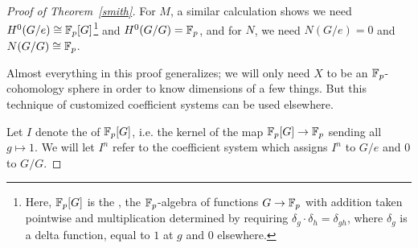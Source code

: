 \begin{proof}[Proof of Theorem~\ref{smith}]
For $M$, a similar calculation shows we need $H^0(G/e)\cong\mathbb F_p[G]$\footnote{Here, $\mathbb F_p[G]$ is the , the $\mathbb F_p$-algebra of functions $G\to\mathbb F_p$ with addition taken pointwise and multiplication determined by
requiring $\delta_g\cdot\delta_h = \delta_{gh}$, where $\delta_g$ is a delta function, equal to $1$ at $g$ and $0$
elsewhere.} and $H^0(G/G) = \mathbb F_p$, and for $N$, we need $N(G/e) = 0$ and $N(G/G)\cong\mathbb F_p$.
\begin{rem}
Almost everything in this proof generalizes; we will only need $X$ to be an $\mathbb F_p$-cohomology sphere in order to
know dimensions of a few things. But this technique of customized coefficient systems can be used elsewhere.
\end{rem}
Let $I$ denote the  of $\mathbb F_p[G]$, i.e. the kernel of the map $\mathbb F_p[G]\to\mathbb F_p$ sending all
$g\mapsto 1$. We will let $I^n$ refer to the coefficient system which assigns $I^n$ to $G/e$ and $0$ to $G/G$.


\end{proof}
